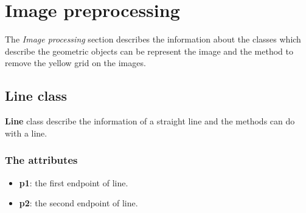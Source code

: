 \section{Image preprocessing}
The \textit{Image processing} section describes the information about the classes which describe the geometric objects can be represent the image and the method to remove the yellow grid on the images.
\subsection{Line class}
\textbf{Line} class describe the information of a straight line and the methods can do with a line.
\subsubsection{The attributes}
\begin{itemize}
\item\textbf{p1}: the first endpoint of line.
\item\textbf{p2}: the second endpoint of line.
\end{itemize}
